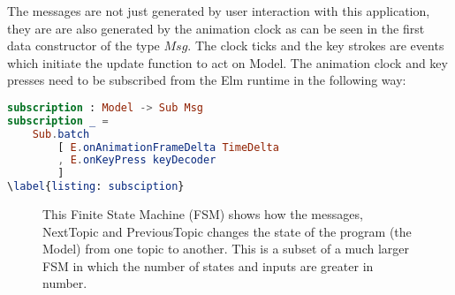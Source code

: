 The messages are not just generated by user interaction with this application,
they are are also generated by the animation clock as can be seen in
the first data constructor of the type $Msg$.  The clock ticks and the key
strokes are events which initiate the update function to act on Model.  The
animation clock and key presses need to be subscribed from the Elm runtime in
the following way:

\begin{lstlisting}[language=elm
                  , caption={
                            Subscription of Animation clock and Key presses services.
                            Subscriptions are used to catch the events which are
                            emanated outside the DOM. In this code, a system clock
                            and key presses are subscribed to by the program.
                            }
                  ]
subscription : Model -> Sub Msg
subscription _ =
    Sub.batch
        [ E.onAnimationFrameDelta TimeDelta
        , E.onKeyPress keyDecoder
        ]
\label{listing: subsciption}
\end{lstlisting}

\begin{figure}[h] %
\centering %
\caption{This Finite State Machine (FSM) 
        shows how the messages, NextTopic and PreviousTopic
        changes the state of the program (the Model) from
        one topic to another. This is a subset of a much larger
        FSM in which the number of states and inputs are greater
        in number.
        }
\label{fig:my_label}
\end{figure}
